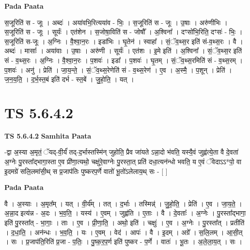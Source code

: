 \documentclass[17pt]{extarticle}
\begin{document}
\textbf{Pada Paata} \newline

स॒जूरिति॑ स - जूः । अब्दः॑ । अया॑वभि॒रित्यया॑व - भिः॒ । स॒जूरिति॑ स - जूः । उ॒षाः । अरु॑णीभिः । स॒जूरिति॑ स - जूः । सूर्यः॑ । एत॑शेन । स॒जोषा॒विति॑ स - जोषौ᳚ । अ॒श्विना᳚ । दꣳसो॑भि॒रिति॒ दꣳसः॑ - भिः॒ । स॒जूरिति॑ स-जूः । अ॒ग्निः । वै॒श्वा॒न॒रः । इडा॑भिः । घृ॒तेन॑ । स्वाहा᳚ । सं॒ॅव॒थ्स॒र इति॑ सं-व॒थ्स॒रः । वै । अब्दः॑ । मासाः᳚ । अया॑वाः । उ॒षाः । अरु॑णी । सूर्यः॑ । एत॑शः । इ॒मे इति॑ । अ॒श्विना᳚ । सं॒ॅव॒थ्स॒र इति॑ सं - व॒थ्स॒रः । अ॒ग्निः । वै॒श्वा॒न॒रः । प॒शवः॑ । इडा᳚ । प॒शवः॑ । घृ॒तम् । सं॒ॅव॒थ्स॒रमिति॑ सं - व॒थ्स॒रम् । प॒शवः॑ । अनु॑ । प्रेति॑ । जा॒य॒न्ते॒ । सं॒ॅव॒थ्स॒रेणेति॑ सं - व॒थ्स॒रेण॑ । ए॒व । अ॒स्मै॒ । प॒शून् । प्रेति॑ । ज॒न॒य॒ति॒ । द॒र्भ॒स्त॒बं इति॑ दर्भ - स्त॒बें । जु॒हो॒ति॒ । यत् ।  \newline




\section*{ TS 5.6.4.2 }

\textbf{TS 5.6.4.2 } \newline
\textbf{Samhita Paata} \newline

-द्वा अ॒स्या अ॒मृतं॒ ॅयद्-वी॒र्यं॑ तद्-द॒र्भास्तस्मि॑न् जुहोति॒ प्रैव जा॑यते ऽन्ना॒दो भ॑वति॒ यस्यै॒वं जुह्व॑त्ये॒ता वै दे॒वता॑ अ॒ग्नेः पु॒रस्ता᳚द्भागा॒स्ता ए॒व प्री॑णा॒त्यथो॒ चक्षु॑रे॒वाग्नेः पु॒रस्ता॒त् प्रति॑ दधा॒त्यन॑न्धो भवति॒ य ए॒वं ॅवेदाऽऽ*पो॒ वा इ॒दमग्रे॑ सलि॒लमा॑सी॒थ् स प्र॒जाप॑तिः पुष्करप॒र्णे वातो॑ भू॒तो॑ऽलेलाय॒थ् सः - [  ] \newline

\textbf{Pada Paata} \newline

वै । अ॒स्याः । अ॒मृत᳚म् । यत् । वी॒र्य᳚म् । तत् । द॒र्भाः । तस्मिन्न्॑ । जु॒हो॒ति॒ । प्रेति॑ । ए॒व । जा॒य॒ते॒ । अ॒न्ना॒द इत्य॑न्न - अ॒दः । भ॒व॒ति॒ । यस्य॑ । ए॒वम् । जुह्व॑ति । ए॒ताः । वै । दे॒वताः᳚ । अ॒ग्नेः । पु॒रस्ता᳚द्भागा॒ इति॑ पु॒रस्ता᳚त् - भा॒गाः॒ । ताः । ए॒व । प्री॒णा॒ति॒ । अथो॒ इति॑ । चक्षुः॑ । ए॒व । अ॒ग्नेः । पु॒रस्ता᳚त् । प्रतीति॑ । द॒धा॒ति॒ । अन॑न्धः । भ॒व॒ति॒ । यः । ए॒वम् । वेद॑ । आपः॑ । वै । इ॒दम् । अग्रे᳚ । स॒लि॒लम् । आ॒सी॒त् । सः । प्र॒जाप॑ति॒रिति॑ प्र॒जा - प॒तिः॒ । पु॒ष्क॒र॒प॒र्ण इति॑ पुष्कर - प॒र्णे । वातः॑ । भू॒तः । अ॒ले॒ला॒य॒त् । सः ।  \newline
\end{document}
